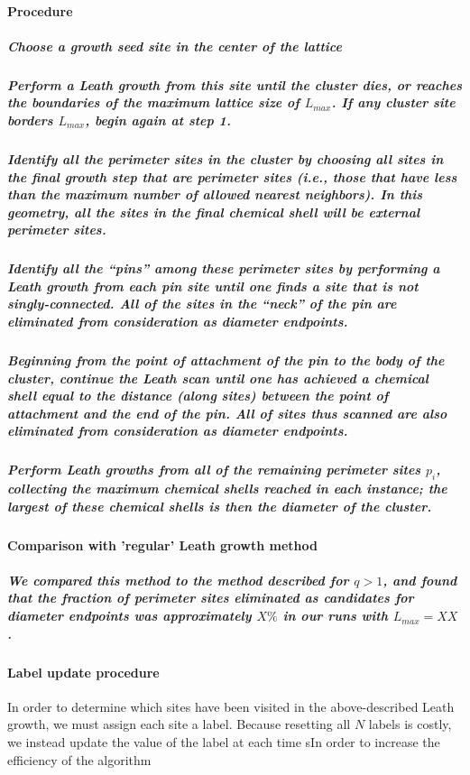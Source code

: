 \documentclass[pre,preprint]{revtex4-1}
\begin{document}
\paragraph{Procedure}
\label{sec-1.2.4.6}
\subparagraph{Choose a growth seed site in the center of the lattice}
\label{sec-1.2.4.6.1}
\subparagraph{Perform a Leath growth from this site until the cluster dies, or reaches the boundaries of the maximum lattice size of $L_{max}$. If any cluster site borders $L_{max}$, begin again at step 1.}
\label{sec-1.2.4.6.2}
\subparagraph{Identify all the perimeter sites in the cluster by choosing all sites in the final growth step that are perimeter sites (i.e., those that have less than the maximum number of allowed nearest neighbors).  In this geometry, all the sites in the final chemical shell will be external perimeter sites.}
\label{sec-1.2.4.6.3}
\subparagraph{Identify all the ``pins'' among these perimeter sites by performing a Leath growth from each pin site until one finds a site that is not singly-connected.  All of the sites in the ``neck'' of the pin are eliminated from consideration as diameter endpoints.}
\label{sec-1.2.4.6.4}
\subparagraph{Beginning from the point of attachment of the pin to the body of the cluster, continue the Leath scan until one has achieved a chemical shell equal to the distance (along sites) between the point of attachment and the end of the pin.  All of sites thus scanned are also eliminated from consideration as diameter endpoints.}
\label{sec-1.2.4.6.5}
\subparagraph{Perform Leath growths from all of the remaining perimeter sites $p_i$, collecting the maximum chemical shells reached in each instance; the largest of these chemical shells is then the diameter of the cluster.}
\label{sec-1.2.4.6.6}
\paragraph{Comparison with 'regular' Leath growth method}
\label{sec-1.2.4.7}
\subparagraph{We compared this method to the method described for $q>1$, and found that the fraction of perimeter sites eliminated as candidates for diameter endpoints was approximately $X\%$ in our runs with $L_{max}=XX$.}
\label{sec-1.2.4.7.1}
\paragraph{Label update procedure}
\label{sec-1.2.4.8}

In order to determine which sites have been visited in the above-described Leath growth, we must assign each site a label.  Because resetting all $N$ labels is costly, we instead update the value of the label at each time sIn order to increase the efficiency of the algorithm
\end{document}
